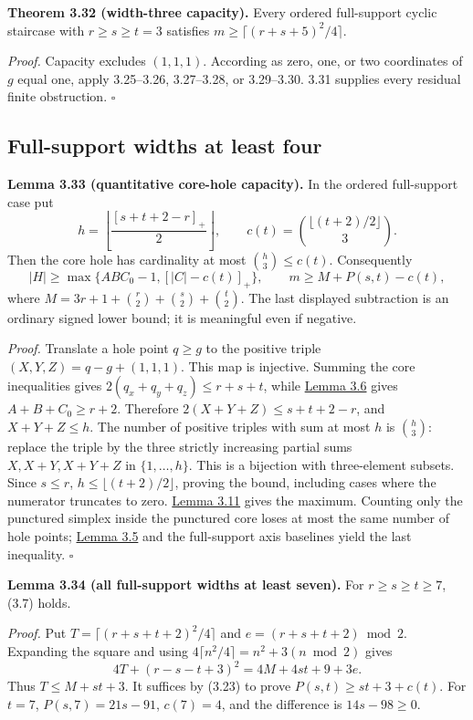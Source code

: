 \documentclass[11pt]{article}
\begin{document}
\label{res:A3.9}
\textbf{Theorem 3.32 (width-three capacity).}
Every ordered full-support cyclic staircase with $r\ge s\ge t=3$ satisfies
$m\ge\lceil(r+s+5)^2/4\rceil$.

\emph{Proof.}
Capacity excludes $(1,1,1)$.  According as zero, one, or two coordinates
of $g$ equal one, apply 3.25--3.26, 3.27--3.28, or 3.29--3.30.
3.31 supplies every residual finite obstruction. \ensuremath{\square}


\subsection{Full-support widths at least four}
\label{res:A.30}
\textbf{Lemma 3.33 (quantitative core-hole capacity).} In the ordered full-support case put
\[
h=\left\lfloor\frac{[s+t+2-r]_+}{2}\right\rfloor,
\qquad c(t)=\binom{\lfloor(t+2)/2\rfloor}{3}.
\]
Then the core hole has cardinality at most \(\binom h3\le c(t)\). Consequently
\[
|H|\ge\max\{ABC_0-1,[|C|-c(t)]_+\},\qquad
m\ge M+P(s,t)-c(t), \tag{3.23}
\]
where \(M=3r+1+\binom r2+\binom s2+\binom t2\). The last displayed subtraction is an ordinary signed lower bound; it is meaningful even if negative.

\emph{Proof.} Translate a hole point \(q\ge g\) to the positive triple \((X,Y,Z)=q-g+(1,1,1)\). This map is injective. Summing the core inequalities gives \(2(q_x+q_y+q_z)\le r+s+t\), while \hyperref[res:A.5]{Lemma 3.6} gives \(A+B+C_0\ge r+2\). Therefore \(2(X+Y+Z)\le s+t+2-r\), and \(X+Y+Z\le h\). The number of positive triples with sum at most \(h\) is \(\binom h3\): replace the triple by the three strictly increasing partial sums \(X,X+Y,X+Y+Z\) in \(\{1,\ldots,h\}\). This is a bijection with three-element subsets. Since \(s\le r\), \(h\le\lfloor(t+2)/2\rfloor\), proving the bound, including cases where the numerator truncates to zero. \hyperref[res:A.10]{Lemma 3.11} gives the maximum. Counting only the punctured simplex inside the punctured core loses at most the same number of hole points; \hyperref[res:A.4]{Lemma 3.5} and the full-support axis baselines yield the last inequality. \ensuremath{\square}

\label{res:A.31}
\textbf{Lemma 3.34 (all full-support widths at least seven).} For \(r\ge s\ge t\ge7\), (3.7) holds.

\emph{Proof.} Put \(T=\lceil(r+s+t+2)^2/4\rceil\) and \(e=(r+s+t+2)\bmod2\). Expanding the square and using \(4\lceil n^2/4\rceil=n^2+3(n\bmod2)\) gives
\[
4T+(r-s-t+3)^2=4M+4st+9+3e.
\]
Thus \(T\le M+st+3\). It suffices by (3.23) to prove \(P(s,t)\ge st+3+c(t)\). For \(t=7\), \(P(s,7)=21s-91\), \(c(7)=4\), and the difference is \(14s-98\ge0\).
\end{document}
